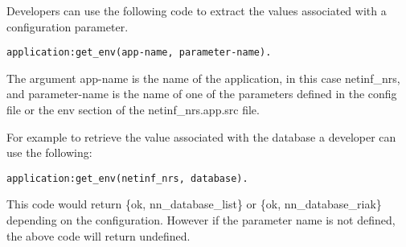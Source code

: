 Developers can use the following code to extract the values associated with a configuration parameter.

\begin {verbatim}
application:get_env(app-name, parameter-name). 
\end{verbatim}

The argument app-name is the name of the application, in this case netinf\_nrs, and parameter-name is the name of one of the parameters defined in the config file or the env section of the netinf\_nrs.app.src file.

For example to retrieve the value associated with the database a developer can use the following:

\begin {verbatim}
application:get_env(netinf_nrs, database).
\end{verbatim}

This code would return \{ok, nn\_database\_list\} or \{ok, nn\_database\_riak\} depending on the configuration. However if the parameter name is not defined, the above code will return undefined.

